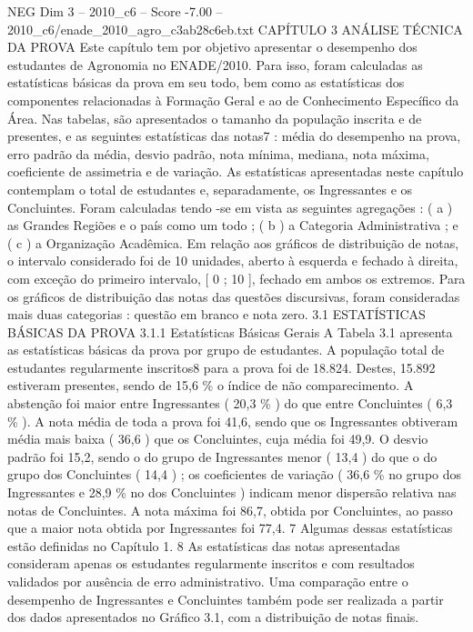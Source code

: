 \begin{textsample}{NEG Dim 3 – 2010\_c6 – Score -7.00 – 2010\_c6/enade\_2010\_agro\_c3ab28c6eb.txt}  \label{ex:f3_neg_003}
CAPÍTULO 3 ANÁLISE TÉCNICA DA PROVA Este capítulo tem por objetivo apresentar o desempenho dos estudantes de Agronomia no ENADE/2010.
Para isso, foram calculadas as estatísticas básicas da prova em seu todo, bem como as estatísticas dos componentes relacionadas à Formação Geral e ao de Conhecimento Específico da Área.
Nas tabelas, são apresentados o tamanho da população inscrita e de presentes, e as seguintes estatísticas das notas7 : média do desempenho na prova, erro padrão da média, desvio padrão, nota mínima, mediana, nota máxima, coeficiente de assimetria e de variação.
As estatísticas apresentadas neste capítulo contemplam o total de estudantes e, separadamente, os Ingressantes e os Concluintes.
Foram calculadas tendo -se em vista as seguintes agregações : ( a ) as Grandes Regiões e o país como um todo ; ( b ) a Categoria Administrativa ; e ( c ) a Organização Acadêmica.
Em relação aos gráficos de distribuição de notas, o intervalo considerado foi de 10 unidades, aberto à esquerda e fechado à direita, com exceção do primeiro intervalo, [ 0 ; 10 ], fechado em ambos os extremos.
Para os gráficos de distribuição das notas das questões discursivas, foram consideradas mais duas categorias : questão em branco e nota zero. 3.1 ESTATÍSTICAS BÁSICAS DA PROVA 3.1.1 Estatísticas Básicas Gerais A Tabela 3.1 apresenta as estatísticas básicas da prova por grupo de estudantes.
A população total de estudantes regularmente inscritos8 para a prova foi de 18.824.
Destes, 15.892 estiveram presentes, sendo de 15,6 \% o índice de não comparecimento.
A abstenção foi maior entre Ingressantes ( 20,3 \% ) do que entre Concluintes ( 6,3 \% ).
A nota média de toda a prova foi 41,6, sendo que os Ingressantes obtiveram média mais baixa ( 36,6 ) que os Concluintes, cuja média foi 49,9.
O desvio padrão foi 15,2, sendo o do grupo de Ingressantes menor ( 13,4 ) do que o do grupo dos Concluintes ( 14,4 ) ; os coeficientes de variação ( 36,6 \% no grupo dos Ingressantes e 28,9 \% no dos Concluintes ) indicam menor dispersão relativa nas notas de Concluintes.
A nota máxima foi 86,7, obtida por Concluintes, ao passo que a maior nota obtida por Ingressantes foi 77,4. 7 Algumas dessas estatísticas estão definidas no Capítulo 1. 8 As estatísticas das notas apresentadas consideram apenas os estudantes regularmente inscritos e com resultados validados por ausência de erro administrativo.
Uma comparação entre o desempenho de Ingressantes e Concluintes também pode ser realizada a partir dos dados apresentados no Gráfico 3.1, com a distribuição de notas finais.

\end{textsample}
